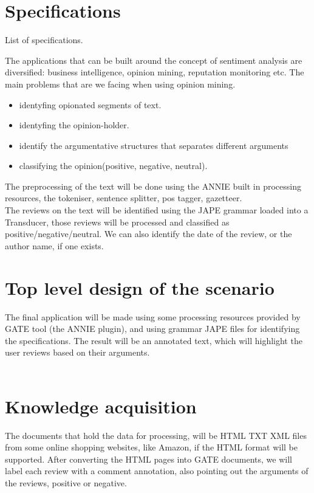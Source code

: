 \documentclass[a4paper,12pt]{report}
\begin{document}
\section{Specifications}
List of specifications.

The applications that can be built around the concept of sentiment analysis are diversified: business intelligence, opinion mining, reputation monitoring etc. The main problems that are we facing when using opinion mining.\\
	\begin{itemize}
	 \item identyfing opionated segments of text.
	 \item identyfing the opinion-holder.
	 \item identify the argumentative structures that separates different arguments
	 \item classifying the opinion(positive, negative, neutral).
	\end{itemize}

	The preprocessing of the text will be done using the ANNIE built in processing resources, the tokeniser, sentence splitter, pos tagger, gazetteer.\\
	The reviews on the text will be identified using the JAPE grammar loaded into a Transducer, those reviews will be processed and classified as positive/negative/neutral. We can also identify the date of the review, or the author name, if one exists.
	
\section{Top level design of the scenario}
The final application will be made using some processing resources provided by GATE tool (the ANNIE plugin), and using grammar JAPE files for identifying the specifications. The result will be an annotated text, which will highlight the user reviews based on their arguments.\\
\\


\section{Knowledge acquisition}

The documents that hold the data for processing, will be HTML \/ TXT \/ XML files from some online shopping websites, like Amazon, if the HTML format will be supported. After converting the HTML pages into GATE documents, we will label each review with a comment annotation, also pointing out the arguments of the reviews, positive or negative.\\
\end{document}
